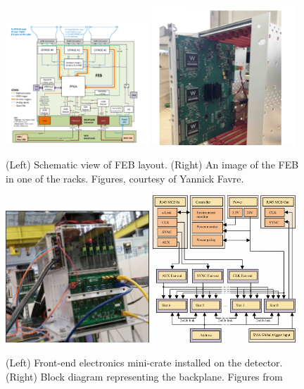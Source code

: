 \begin{figure}[h!]
	\centering
\includegraphics[width=0.48\textwidth]{figures/FEB.png}
\includegraphics[width=0.48\textwidth]{figures/FEB2.png}
\caption{(Left) Schematic view of FEB layout. (Right) An image of the FEB in one of the racks. Figures, courtesy of Yannick Favre.}
\label{fig:FEB}
\end{figure}

\begin{figure}[h!]
\centering
\includegraphics[width=0.48\textwidth]{figures/crateInstalled.png}
\includegraphics[width=0.48\textwidth]{figures/backplane.png}
\caption{(Left) Front-end electronics mini-crate installed on the detector. (Right) Block diagram representing the backplane. Figures from \cite{52Georgi}}
\label{fig:crate}
\end{figure}

